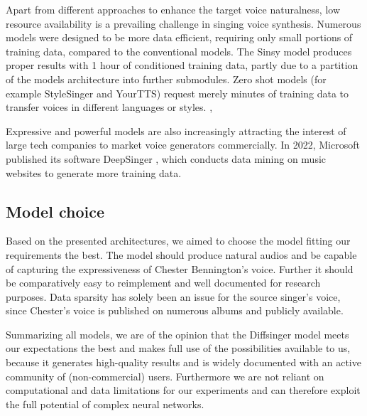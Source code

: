 \documentclass[a4paper]{article}
\begin{document}
	Apart from different approaches to enhance the target voice naturalness, low resource availability is a prevailing challenge in singing voice synthesis. Numerous models were designed to be more data efficient, requiring only small portions of training data, compared to the conventional models. The Sinsy \cite{Cho2021} model produces proper results with 1 hour of conditioned training data, partly due to a partition of the models architecture into further submodules. Zero shot models (for example StyleSinger and YourTTS) request merely minutes of training data to transfer voices in different languages or styles. \cite{Casanova2021},\cite{Zhang2024}
	
	Expressive and powerful models are also increasingly attracting the interest of large tech companies to market voice generators commercially. In 2022, Microsoft published its software DeepSinger \cite{Ren2020}, which conducts data mining on music websites to generate more training data. 
	
	\subsection{Model choice}
	
	Based on the presented architectures, we aimed to choose the model fitting our requirements the best. The model should produce natural audios and be capable of capturing the expressiveness of Chester Bennington’s voice. Further it should be comparatively easy to reimplement and well documented for research purposes. Data sparsity has solely been an issue for the source singer's voice, since Chester’s voice is published on numerous albums and publicly available. 
	
	Summarizing all models, we are of the opinion that the Diffsinger model meets our expectations the best and makes full use of the possibilities available to us, because it generates high-quality results and is widely documented with an active community of (non-commercial) users. Furthermore we are not reliant on computational and data limitations for our experiments and can therefore exploit the full potential of complex neural networks.
	
\end{document}
